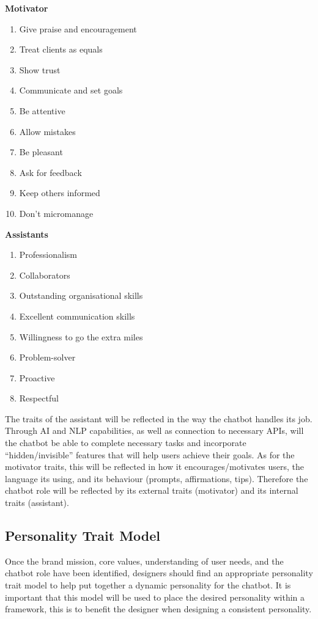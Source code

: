     \textbf{Motivator}
    \begin{enumerate}
        \item Give praise and encouragement
        \item Treat clients as equals
        \item Show trust
        \item Communicate and set goals
        \item Be attentive
        \item Allow mistakes
        \item Be pleasant 
        \item Ask for feedback
        \item Keep others informed
        \item Don’t micromanage
    \end{enumerate}
    
    \textbf{Assistants}
    \begin{enumerate}
        \item Professionalism
        \item Collaborators
        \item Outstanding organisational skills
        \item Excellent communication skills
        \item Willingness to go the extra miles
        \item Problem-solver
        \item Proactive
        \item Respectful
    \end{enumerate}
    
 
    The traits of the assistant will be reflected in the way the chatbot handles its job. Through AI and NLP capabilities, as well as connection to necessary APIs, will the chatbot be able to complete necessary tasks and incorporate “hidden/invisible” features that will help users achieve their goals. As for the motivator traits, this will be reflected in how it encourages/motivates users, the language its using, and its behaviour (prompts, affirmations, tips). Therefore the chatbot role will be reflected by its external traits (motivator) and its internal traits (assistant).
    
\vspace{5mm}

    \subsection{Personality Trait Model}
    Once the brand mission, core values, understanding of user needs, and the chatbot role have been identified, designers should find an appropriate personality trait model to help put together a dynamic personality for the chatbot. It is important that this model will be used to place the desired personality within a framework, this is to benefit the designer when designing a consistent personality. 
    
